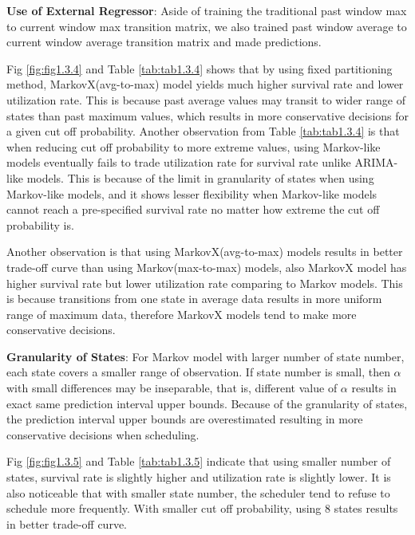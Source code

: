 \documentclass{article}
\begin{document}
\begin{flushleft}
\textbf{Use of External Regressor}: Aside of training the traditional past
window max to current window max transition matrix, we also trained past window
average to current window average transition matrix and made predictions. 

Fig \ref{fig:fig1.3.4} and Table \ref{tab:tab1.3.4} shows that by using fixed
partitioning method, MarkovX(avg-to-max) model yields much higher survival rate
and lower utilization rate. This is because past average values may transit to
wider range of states than past maximum values, which results in more
conservative decisions for a given cut off probability. Another observation from
Table \ref{tab:tab1.3.4} is that when reducing cut off probability to more
extreme values, using Markov-like models eventually fails to trade utilization
rate for survival rate unlike ARIMA-like models. This is because of the limit in
granularity of states when using Markov-like models, and it shows lesser
flexibility when Markov-like models cannot reach a pre-specified survival rate
no matter how extreme the cut off probability is. 

Another observation is that using MarkovX(avg-to-max) models results in better
trade-off curve than using Markov(max-to-max) models, also MarkovX model has
higher survival rate but lower utilization rate comparing to Markov models. This
is because transitions from one state in average data results in more uniform
range of maximum data, therefore MarkovX models tend to make more conservative
decisions.
\end{flushleft}

\begin{flushleft}
\textbf{Granularity of States}: For Markov model with larger number of state
number, each state covers a smaller range of observation. If state number is
small, then $\alpha$ with small differences may be inseparable, that is,
different value of $\alpha$ results in exact same prediction interval upper
bounds. Because of the granularity of states, the prediction interval upper
bounds are overestimated resulting in more conservative decisions when
scheduling.

Fig \ref{fig:fig1.3.5} and Table \ref{tab:tab1.3.5} indicate that using smaller
number of states, survival rate is slightly higher and utilization rate is
slightly lower. It is also noticeable that with smaller state number, the
scheduler tend to refuse to schedule more frequently. With smaller cut off
probability, using $8$ states results in better trade-off curve.
\end{flushleft}
\end{document}
